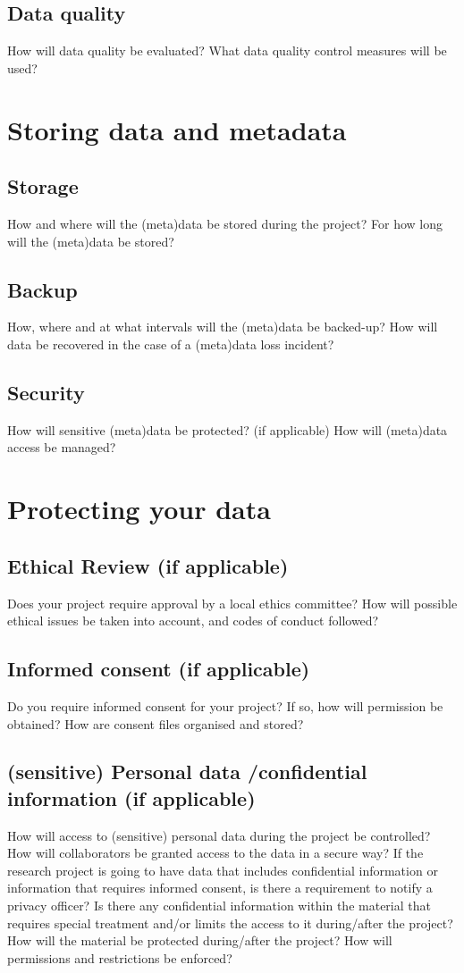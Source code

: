 \documentclass[11pt,a4paper]{article}
\begin{document}
	\subsection{Data quality}
	How will data quality be evaluated?
	What data quality control measures will be used?
	
	\section{Storing data and metadata}
	\subsection{Storage}
	How and where will the (meta)data be stored during the project?
	For how long will the (meta)data be stored?
	
	\subsection{Backup}
	How, where and at what intervals will the (meta)data be backed-up?
	How will data be recovered in the case of a (meta)data loss incident?
	
	\subsection{Security}
	How will sensitive (meta)data be protected? (if applicable)
	How will (meta)data access be managed?
	
	\section{Protecting your data}
	\subsection{Ethical Review (if applicable)}
	Does your project require approval by a local ethics committee?
	How will possible ethical issues be taken into account, and codes of conduct followed?
	\subsection{Informed consent (if applicable)}
	Do you require informed consent for your project?
	If so, how will permission be obtained?
	How are consent files organised and stored?
	
	
	\subsection{(sensitive) Personal data /confidential information (if applicable)}
	How will access to (sensitive) personal data during the project be controlled?
	How will collaborators be granted access to the data in a secure way?
	If the research project is going to have data that includes confidential information or
	information that requires informed consent, is there a requirement to notify a privacy officer?
	Is there any confidential information within the material that requires special treatment
	and/or limits the access to it during/after the project?
	How will the material be protected during/after the project?
	How will permissions and restrictions be enforced?
	
\end{document}
